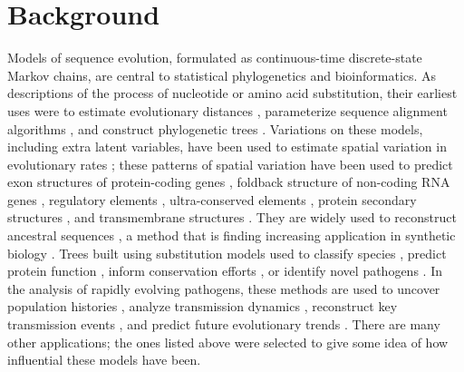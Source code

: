 \documentclass{bmcart}
\begin{document}
\section*{Background}

Models of sequence evolution, formulated as continuous-time discrete-state Markov chains,
are central to statistical phylogenetics and bioinformatics.
As descriptions of the process of nucleotide or amino acid substitution,
their earliest uses were to estimate evolutionary distances \cite{JukesCantor69},
parameterize sequence alignment algorithms \cite{DayhoffEtal72},
and construct phylogenetic trees \cite{Felsenstein81}.
Variations on these models, including extra latent variables,
have been used to estimate spatial variation in evolutionary rates \cite{Yang93,Yang94};
these patterns of spatial variation have been used to
predict exon structures of protein-coding genes \cite{PedersenHein2003,SiepelHaussler04b},
foldback structure of non-coding RNA genes \cite{PedersenEtAl2006,PollardEtAl2006},
regulatory elements \cite{PedersenEtAl04},
ultra-conserved elements \cite{SiepelEtAl2005},
protein secondary structures \cite{GoldmanEtAl96},
and transmembrane structures \cite{LioGoldman99}.
They are widely used to reconstruct ancestral sequences \cite{BlanchetteEtAl2004,UgaldeEtAl2004,Liberles2007,OrtlundEtAl2007,GaucherEtAl2008,AshkenazyEtAl2012,AlcolombriEtAl2011,SantiagoOrtizEtAl2015,ZakasEtAl2016},
a method that is finding increasing application in synthetic biology \cite{Liberles2007,AlcolombriEtAl2011,SantiagoOrtizEtAl2015,ZakasEtAl2016}.
Trees built using substitution models used to classify species \cite{pmid26385966},
predict protein function \cite{EngelhardtEtAl2005},
inform conservation efforts \cite{pmid25561668},
or identify novel pathogens \cite{pmid12690091}.
In the analysis of rapidly evolving pathogens, these methods are used to
uncover population histories \cite{pmid15703244},
analyze transmission dynamics \cite{pmid22927414},
reconstruct key transmission events \cite{pmid27783600},
and predict future evolutionary trends \cite{pmid27774306}.
There are many other applications;
the ones listed above were selected to give some idea of how influential these models have been.
\end{document}
